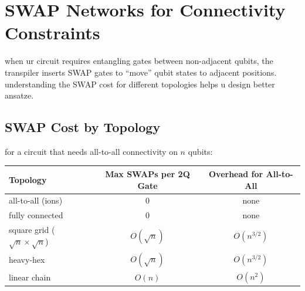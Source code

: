 \documentclass[11pt,a4paper]{article}
\theoremstyle{definition}
\theoremstyle{remark}
\begin{document}
\begin{center}
\end{center}

\section{SWAP Networks for Connectivity Constraints}

when ur circuit requires entangling gates between non-adjacent qubits, the transpiler inserts SWAP gates to ``move'' qubit states to adjacent positions. understanding the SWAP cost for different topologies helps u design better ansatze.

\subsection{SWAP Cost by Topology}

for a circuit that needs all-to-all connectivity on $n$ qubits:

\begin{center}
\renewcommand{\arraystretch}{1.3}
\begin{tabular}{|l|c|c|}
\hline
\textbf{Topology} & \textbf{Max SWAPs per 2Q Gate} & \textbf{Overhead for All-to-All} \\
\hline
all-to-all (ions) & 0 & none \\
\hline
fully connected & 0 & none \\
\hline
square grid ($\sqrt{n} \times \sqrt{n}$) & $O(\sqrt{n})$ & $O(n^{3/2})$ \\
\hline
heavy-hex & $O(\sqrt{n})$ & $O(n^{3/2})$ \\
\hline
linear chain & $O(n)$ & $O(n^2)$ \\
\hline
\end{tabular}
\end{center}
\end{document}
